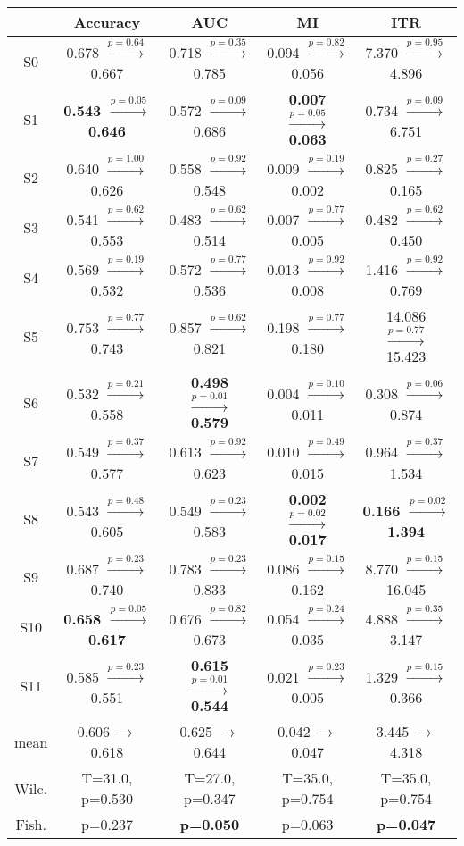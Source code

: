 \begin{tabular}{c c c c c}
\toprule
 & Accuracy & AUC & MI & ITR\\
\midrule
S0 &  0.678 $\xrightarrow{p=0.64}$  0.667 &  0.718 $\xrightarrow{p=0.35}$  0.785 &  0.094 $\xrightarrow{p=0.82}$  0.056 &  7.370 $\xrightarrow{p=0.95}$  4.896\\
S1 & \textbf{ 0.543 $\xrightarrow{p=0.05}$  0.646} &  0.572 $\xrightarrow{p=0.09}$  0.686 & \textbf{ 0.007 $\xrightarrow{p=0.05}$  0.063} &  0.734 $\xrightarrow{p=0.09}$  6.751\\
S2 &  0.640 $\xrightarrow{p=1.00}$  0.626 &  0.558 $\xrightarrow{p=0.92}$  0.548 &  0.009 $\xrightarrow{p=0.19}$  0.002 &  0.825 $\xrightarrow{p=0.27}$  0.165\\
S3 &  0.541 $\xrightarrow{p=0.62}$  0.553 &  0.483 $\xrightarrow{p=0.62}$  0.514 &  0.007 $\xrightarrow{p=0.77}$  0.005 &  0.482 $\xrightarrow{p=0.62}$  0.450\\
S4 &  0.569 $\xrightarrow{p=0.19}$  0.532 &  0.572 $\xrightarrow{p=0.77}$  0.536 &  0.013 $\xrightarrow{p=0.92}$  0.008 &  1.416 $\xrightarrow{p=0.92}$  0.769\\
S5 &  0.753 $\xrightarrow{p=0.77}$  0.743 &  0.857 $\xrightarrow{p=0.62}$  0.821 &  0.198 $\xrightarrow{p=0.77}$  0.180 & 14.086 $\xrightarrow{p=0.77}$ 15.423\\
S6 &  0.532 $\xrightarrow{p=0.21}$  0.558 & \textbf{ 0.498 $\xrightarrow{p=0.01}$  0.579} &  0.004 $\xrightarrow{p=0.10}$  0.011 &  0.308 $\xrightarrow{p=0.06}$  0.874\\
S7 &  0.549 $\xrightarrow{p=0.37}$  0.577 &  0.613 $\xrightarrow{p=0.92}$  0.623 &  0.010 $\xrightarrow{p=0.49}$  0.015 &  0.964 $\xrightarrow{p=0.37}$  1.534\\
S8 &  0.543 $\xrightarrow{p=0.48}$  0.605 &  0.549 $\xrightarrow{p=0.23}$  0.583 & \textbf{ 0.002 $\xrightarrow{p=0.02}$  0.017} & \textbf{ 0.166 $\xrightarrow{p=0.02}$  1.394}\\
S9 &  0.687 $\xrightarrow{p=0.23}$  0.740 &  0.783 $\xrightarrow{p=0.23}$  0.833 &  0.086 $\xrightarrow{p=0.15}$  0.162 &  8.770 $\xrightarrow{p=0.15}$ 16.045\\
S10 & \textbf{ 0.658 $\xrightarrow{p=0.05}$  0.617} &  0.676 $\xrightarrow{p=0.82}$  0.673 &  0.054 $\xrightarrow{p=0.24}$  0.035 &  4.888 $\xrightarrow{p=0.35}$  3.147\\
S11 &  0.585 $\xrightarrow{p=0.23}$  0.551 & \textbf{ 0.615 $\xrightarrow{p=0.01}$  0.544} &  0.021 $\xrightarrow{p=0.23}$  0.005 &  1.329 $\xrightarrow{p=0.15}$  0.366\\
\midrule
mean & 0.606 $\rightarrow$ 0.618 & 0.625 $\rightarrow$ 0.644 & 0.042 $\rightarrow$ 0.047 & 3.445 $\rightarrow$ 4.318\\
Wilc. & T=31.0, p=0.530 & T=27.0, p=0.347 & T=35.0, p=0.754 & T=35.0, p=0.754\\
Fish. & p=0.237 & \textbf{p=0.050} & p=0.063 & \textbf{p=0.047}\\
\bottomrule
\end{tabular}
